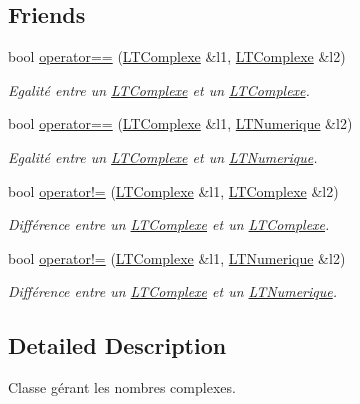 \subsection*{Friends}
\begin{DoxyCompactItemize}
\item 
bool \hyperlink{class_l_t_complexe_a90de9fd7544467c35afbcb629ee15ef8}{operator==} (\hyperlink{class_l_t_complexe}{L\+T\+Complexe} \&l1, \hyperlink{class_l_t_complexe}{L\+T\+Complexe} \&l2)
\begin{DoxyCompactList}\small\item\em Egalité entre un \hyperlink{class_l_t_complexe}{L\+T\+Complexe} et un \hyperlink{class_l_t_complexe}{L\+T\+Complexe}. \end{DoxyCompactList}\item 
bool \hyperlink{class_l_t_complexe_ab60d8e825b53b8ffdfd42c983314c737}{operator==} (\hyperlink{class_l_t_complexe}{L\+T\+Complexe} \&l1, \hyperlink{class_l_t_numerique}{L\+T\+Numerique} \&l2)
\begin{DoxyCompactList}\small\item\em Egalité entre un \hyperlink{class_l_t_complexe}{L\+T\+Complexe} et un \hyperlink{class_l_t_numerique}{L\+T\+Numerique}. \end{DoxyCompactList}\item 
bool \hyperlink{class_l_t_complexe_a853bdb2627cdac60f907026fef1bfec3}{operator!=} (\hyperlink{class_l_t_complexe}{L\+T\+Complexe} \&l1, \hyperlink{class_l_t_complexe}{L\+T\+Complexe} \&l2)
\begin{DoxyCompactList}\small\item\em Différence entre un \hyperlink{class_l_t_complexe}{L\+T\+Complexe} et un \hyperlink{class_l_t_complexe}{L\+T\+Complexe}. \end{DoxyCompactList}\item 
bool \hyperlink{class_l_t_complexe_a0c157bab9d494f8c817fe550ec5279d1}{operator!=} (\hyperlink{class_l_t_complexe}{L\+T\+Complexe} \&l1, \hyperlink{class_l_t_numerique}{L\+T\+Numerique} \&l2)
\begin{DoxyCompactList}\small\item\em Différence entre un \hyperlink{class_l_t_complexe}{L\+T\+Complexe} et un \hyperlink{class_l_t_numerique}{L\+T\+Numerique}. \end{DoxyCompactList}\end{DoxyCompactItemize}


\subsection{Detailed Description}
Classe gérant les nombres complexes. 

